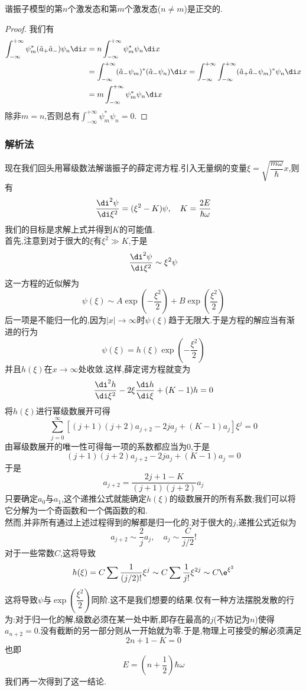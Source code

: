 \documentclass{ctexart}
\begin{document}
\begin{theorem}
    谐振子模型的第$n$个激发态和第$m$个激发态($n\neq m$)是正交的.
\end{theorem}
\begin{proof}
    我们有
    \[\begin{aligned}
        \int_{-\infty}^{+\infty}\psi_m^\ast(\hat{a}_+\hat{a}_-)\psi_n\di x
        &=n\int_{-\infty}^{+\infty}\psi_m^\ast\psi_n\di x\\
        &=\int_{-\infty}^{+\infty}(\hat{a}_-\psi_m)^\ast(\hat{a}_-\psi_n)\di x=\int_{-\infty}^{+\infty}\int_{-\infty}^{+\infty}(\hat{a}_+\hat{a}_-\psi_m)^\ast\psi_n\di x\\
        &=m\int_{-\infty}^{+\infty}\psi_m^\ast\psi_n\di x
    \end{aligned}\]
    除非$m=n$,否则总有$\displaystyle\int_{-\infty}^{+\infty}\psi_m^\ast\psi_n=0$.
\end{proof}
\subsubsection{解析法}
现在我们回头用幂级数法解谐振子的薛定谔方程.引入无量纲的变量$\xi=\sqrt{\dfrac{m\omega}{\hbar}}x$,则有
\[\dfrac{\di^2\psi}{\di\xi^2}=(\xi^2-K)\psi,\quad K=\dfrac{2E}{\hbar\omega}\]
我们的目标是求解上式并得到$K$的可能值.\\
\indent 首先,注意到对于很大的$\xi$有$\xi^2\gg K$,于是
\[\dfrac{\di^2\psi}{\di\xi^2}\sim\xi^2\psi\]
这一方程的近似解为
\[\psi(\xi)\sim A\exp\left(-\dfrac{\xi^2}{2}\right)+B\exp\left(\dfrac{\xi^2}{2}\right)\]
后一项是不能归一化的,因为$|x|\to\infty$时$\psi(\xi)$趋于无限大.于是方程的解应当有渐进的行为
\[\psi(\xi)=h(\xi)\exp\left(-\dfrac{\xi^2}{2}\right)\]
并且$h(\xi)$在$x\to\infty$处收敛.这样,薛定谔方程就变为
\[\dfrac{\di^2 h}{\di\xi^2}-2\xi\dfrac{\di h}{\di\xi}+(K-1)h=0\]
将$h(\xi)$进行幂级数展开可得
\[\sum_{j=0}^{\infty}\left[(j+1)(j+2)a_{j+2}-2ja_j+(K-1)a_j\right]\xi^j=0\]
由幂级数展开的唯一性可得每一项的系数都应当为$0$,于是
\[(j+1)(j+2)a_{j+2}-2ja_j+(K-1)a_j=0\]
于是
\[a_{j+2}=\dfrac{2j+1-K}{(j+1)(j+2)}a_j\]
只要确定$a_0$与$a_1$,这个递推公式就能确定$h(\xi)$的级数展开的所有系数;我们可以将它分解为一个奇函数和一个偶函数的和.\\
\indent 然而,并非所有通过上述过程得到的解都是归一化的.对于很大的$j$,递推公式近似为
\[a_{j+2}\sim\dfrac{2}{j}a_j,\quad a_j\sim\dfrac{C}{j/2}!\]
对于一些常数$C$,这将导致
\[h(\xi)=C\sum\dfrac{1}{(j/2)!}\xi^j\sim C\sum\dfrac{1}{j!}\xi^{2j}\sim C\e^{\xi^2}\]
这将导致$\psi$与$\exp\left(\dfrac{\xi^2}{2}\right)$同阶.这不是我们想要的结果.仅有一种方法摆脱发散的行为:对于归一化的解,级数必须在某一处中断,即存在最高的$j$(不妨记为$n$)使得$a_{n+2}=0$.没有截断的另一部分则从一开始就为零.于是,物理上可接受的解必须满足
\[2n+1-K=0\]
也即
\[E=\left(n+\dfrac12\right)\hbar\omega\]
我们再一次得到了这一结论.
\end{document}
